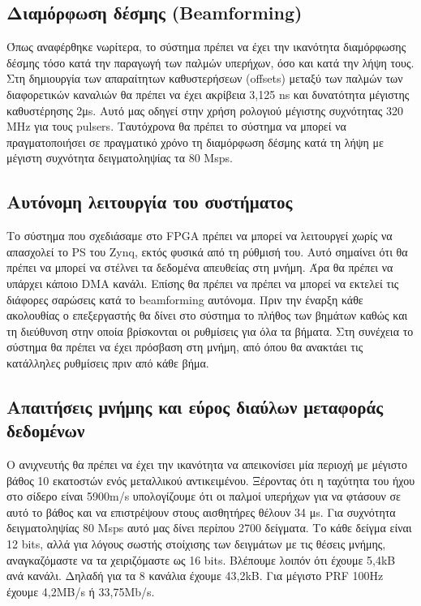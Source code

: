 \documentclass[12pt,a4paper]{book}
\begin{document}
\subsection{Διαμόρφωση δέσμης (Beamforming)}
Όπως αναφέρθηκε νωρίτερα, το σύστημα πρέπει να έχει την ικανότητα διαμόρφωσης δέσμης τόσο κατά την παραγωγή των παλμών υπερήχων, όσο και κατά την λήψη τους. Στη δημιουργία των απαραίτητων καθυστερήσεων (offsets) μεταξύ των παλμών των διαφορετικών καναλιών θα πρέπει να έχει ακρίβεια 3,125 ns και δυνατότητα μέγιστης καθυστέρησης 2μs. Αυτό μας οδηγεί στην χρήση ρολογιού μέγιστης συχνότητας 320 MHz για τους pulsers. Ταυτόχρονα θα πρέπει το σύστημα να μπορεί να πραγματοποιήσει σε πραγματικό χρόνο τη διαμόρφωση δέσμης κατά τη λήψη με μέγιστη συχνότητα δειγματοληψίας τα 80 Msps.


\subsection{Αυτόνομη λειτουργία του συστήματος}
Το σύστημα που σχεδιάσαμε στο FPGA πρέπει να μπορεί να λειτουργεί χωρίς να απασχολεί το PS του Zynq, εκτός φυσικά από τη ρύθμισή του. Αυτό σημαίνει ότι θα πρέπει να μπορεί να στέλνει τα δεδομένα απευθείας στη μνήμη. Άρα θα πρέπει να υπάρχει κάποιο DMA κανάλι. 
Επίσης θα πρέπει να πρέπει να μπορεί να εκτελεί τις διάφορες σαρώσεις κατά το beamforming αυτόνομα. Πριν την έναρξη κάθε ακολουθίας ο επεξεργαστής θα δίνει στο σύστημα το πλήθος των βημάτων καθώς και τη διεύθυνση στην οποία βρίσκονται οι ρυθμίσεις για όλα τα βήματα. Στη συνέχεια το σύστημα θα πρέπει να έχει πρόσβαση στη μνήμη, από όπου θα ανακτάει τις κατάλληλες ρυθμίσεις πριν από κάθε βήμα. 

\subsection{Απαιτήσεις μνήμης και εύρος διαύλων μεταφοράς δεδομένων}
Ο ανιχνευτής θα πρέπει να έχει την ικανότητα να απεικονίσει μία περιοχή με μέγιστο βάθος 10 εκατοστών ενός μεταλλικού αντικειμένου. Ξέροντας ότι η ταχύτητα του ήχου στο σίδερο είναι 5900m/s υπολογίζουμε ότι οι παλμοί υπερήχων για να φτάσουν σε αυτό το βάθος και να επιστρέψουν στους αισθητήρες θέλουν 34 μs. Για συχνότητα δειγματοληψίας 80 Msps αυτό μας δίνει περίπου 2700 δείγματα. Το κάθε δείγμα είναι 12 bits, αλλά για λόγους σωστής στοίχισης των δειγμάτων με τις θέσεις μνήμης, αναγκαζόμαστε να τα χειριζόμαστε ως 16 bits. Βλέπουμε λοιπόν ότι έχουμε 5,4kB ανά κανάλι. Δηλαδή για τα 8 κανάλια έχουμε 43,2kB. Για μέγιστο PRF 100Hz έχουμε 4,2MB/s ή 33,75Mb/s.
\end{document}
